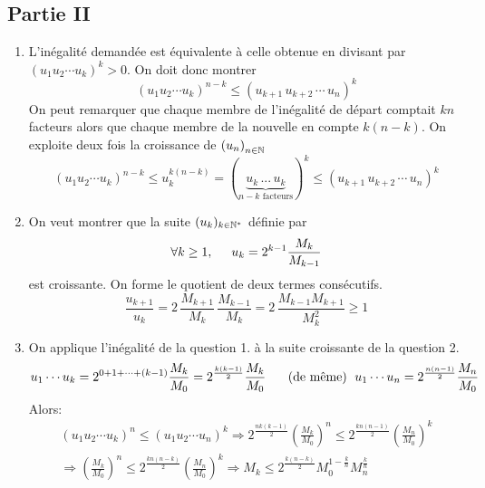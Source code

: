 \subsection*{Partie II}
\begin{enumerate}
  \item L'inégalité demandée est équivalente à celle obtenue en divisant par $(u_1 u_2 \cdots u_k)^k>0$. On doit donc montrer
\begin{displaymath}
  (u_1 u_2 \cdots u_k)^{n-k} \leq (u_{k+1}\,u_{k+2}\, \cdots\, u_n)^k
\end{displaymath}
On peut remarquer que chaque membre de l'inégalité de départ comptait $kn$ facteurs alors que chaque membre de la nouvelle en compte $k(n-k)$. On exploite deux fois la croissance de $\left( u_n\right)_{n\in \mathbb{N}}$
\begin{displaymath}
(u_1 u_2 \cdots u_k)^{n-k} \leq  u_k^{k(n-k)} = (\underset{n-k \text{ facteurs}}{\underbrace{u_k\,  ... \,u_k}})^k 
\leq (u_{k+1}\,u_{k+2}\, \cdots \, u_{n})^k
\end{displaymath}

  \item On veut montrer que la suite $(u_k)_{k\in\mathbb{N}^*}$ définie par
\begin{displaymath}
\forall k \geq 1,\hspace{0.5cm} u_k = 2^{k-1}\frac{M_k}{M_{k-1}}  
\end{displaymath}
est croissante. On forme le quotient de deux termes consécutifs.
\begin{displaymath}
  \frac{u_{k+1}}{u_k} = 2\,\frac{M_{k+1}}{M_k}\,\frac{M_{k-1}}{M_k} = 2\, \frac{M_{k-1}M_{k+1}}{M_k^2} \geq 1 
\end{displaymath}

  \item On applique l'inégalité de la question 1. à la suite croissante de la question 2.
\begin{displaymath}
u_1\cdots u_k = 2^{0+1+\cdots +(k-1)}\frac{M_k}{M_0}=2^{\frac{k(k-1)}{2}}\frac{M_k}{M_0}\hspace{0.5cm} \text{ (de même) }\;
u_1\cdots u_n = 2^{\frac{n(n-1)}{2}}\frac{M_n}{M_0}
\end{displaymath}
Alors:
\begin{multline*}
(u_1 u_2 \cdots u_k)^n \leq (u_1 u_2 \cdots u_n)^k 
\Rightarrow 2^{\frac{nk(k-1)}{2}} \left( \frac{M_k}{M_0}\right)^{n} \leq 2^{\frac{kn(n-1)}{2}} \left( \frac{M_n}{M_0}\right)^{k} \\
\Rightarrow \left( \frac{M_k}{M_0}\right)^{n} \leq 2^{\frac{kn(n-k)}{2}} \left( \frac{M_n}{M_0}\right)^{k} 
\Rightarrow M_k \leq 2^{\frac{k(n-k)}{2}}M_0^{1-\frac{k}{n}} M_n^{\frac{k}{n}}
\end{multline*}

\end{enumerate}


